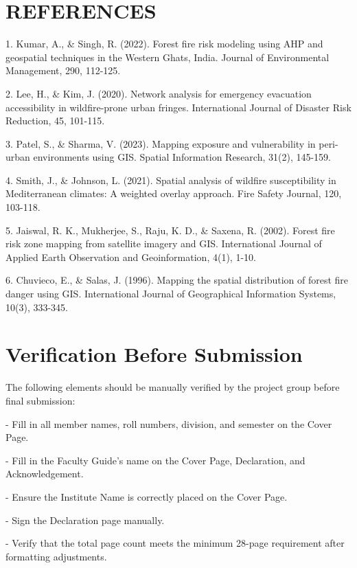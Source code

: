 \documentclass[12pt,a4paper]{article}
\begin{document}
\clearpage
\section*{REFERENCES}

1. Kumar, A., \& Singh, R. (2022). Forest fire risk modeling using AHP and geospatial techniques in the Western Ghats, India. Journal of Environmental Management, 290, 112-125.


2. Lee, H., \& Kim, J. (2020). Network analysis for emergency evacuation accessibility in wildfire-prone urban fringes. International Journal of Disaster Risk Reduction, 45, 101-115.


3. Patel, S., \& Sharma, V. (2023). Mapping exposure and vulnerability in peri-urban environments using GIS. Spatial Information Research, 31(2), 145-159.


4. Smith, J., \& Johnson, L. (2021). Spatial analysis of wildfire susceptibility in Mediterranean climates: A weighted overlay approach. Fire Safety Journal, 120, 103-118.


5. Jaiswal, R. K., Mukherjee, S., Raju, K. D., \& Saxena, R. (2002). Forest fire risk zone mapping from satellite imagery and GIS. International Journal of Applied Earth Observation and Geoinformation, 4(1), 1-10.


6. Chuvieco, E., \& Salas, J. (1996). Mapping the spatial distribution of forest fire danger using GIS. International Journal of Geographical Information Systems, 10(3), 333-345.



\section*{Verification Before Submission}

The following elements should be manually verified by the project group before final submission:


- Fill in all member names, roll numbers, division, and semester on the Cover Page.


- Fill in the Faculty Guide's name on the Cover Page, Declaration, and Acknowledgement.


- Ensure the Institute Name is correctly placed on the Cover Page.


- Sign the Declaration page manually.


- Verify that the total page count meets the minimum 28-page requirement after formatting adjustments.
\end{document}
